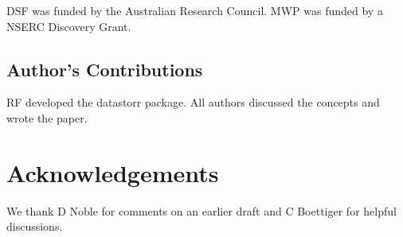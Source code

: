 \documentclass[a4paper,num-refs]{assets/oup-contemporary}
\begin{document}
DSF was funded by the Australian Research Council. MWP was funded by a NSERC Discovery Grant.

\subsection{Author's Contributions}
RF developed the datastorr package. All authors discussed the concepts and wrote the paper. 

\section{Acknowledgements}

We thank D Noble for comments on an earlier draft and C Boettiger for helpful discussions. 




\end{document}
